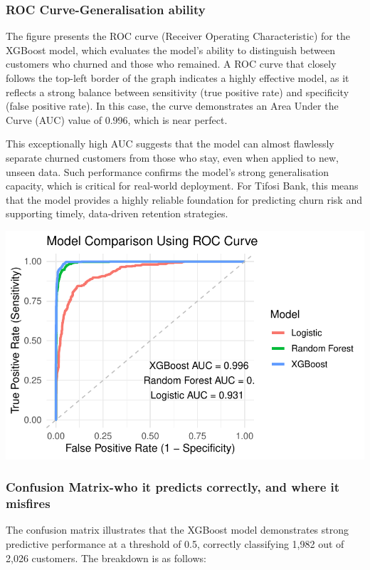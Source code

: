 \documentclass[
  letterpaper,
  DIV=11,
  numbers=noendperiod]{scrartcl}
\begin{document}
\subsubsection{ROC Curve-Generalisation
ability}\label{roc-curve-generalisation-ability}

The figure presents the ROC curve (Receiver Operating Characteristic)
for the XGBoost model, which evaluates the model's ability to
distinguish between customers who churned and those who remained. A ROC
curve that closely follows the top-left border of the graph indicates a
highly effective model, as it reflects a strong balance between
sensitivity (true positive rate) and specificity (false positive rate).
In this case, the curve demonstrates an Area Under the Curve (AUC) value
of 0.996, which is near perfect.

This exceptionally high AUC suggests that the model can almost
flawlessly separate churned customers from those who stay, even when
applied to new, unseen data. Such performance confirms the model's
strong generalisation capacity, which is critical for real-world
deployment. For Tifosi Bank, this means that the model provides a highly
reliable foundation for predicting churn risk and supporting timely,
data-driven retention strategies.

\includegraphics{v4_files/figure-pdf/unnamed-chunk-17-1.pdf}

\subsubsection{Confusion Matrix-who it predicts correctly, and where it
misfires}\label{confusion-matrix-who-it-predicts-correctly-and-where-it-misfires}

The confusion matrix illustrates that the XGBoost model demonstrates
strong predictive performance at a threshold of 0.5, correctly
classifying 1,982 out of 2,026 customers. The breakdown is as follows:
\end{document}
